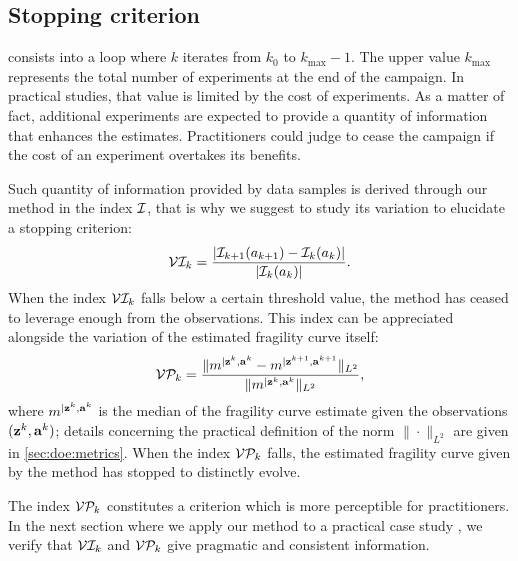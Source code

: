 

\subsection{{Stopping} criterion \label{sec:doe:stopping_crit}}

 consists into a loop where $k$ iterates from $k_0$ to $k_{\max}-1$. The upper value $k_{\max}$ represents the total number of experiments at the end of the campaign. 
In practical studies, that value is limited by the cost of experiments.
%
As a matter of fact, additional experiments are expected to provide a quantity of information that enhances the estimates. %
Practitioners could judge to cease the campaign if the cost of an experiment overtakes its benefits.

Such quantity of information provided by data samples is derived through our method in the index $\mathcal{I}$, that is why we suggest to study its variation to elucidate a {stopping} criterion:
\begin{equation}
    \mathcal{V}\mathcal{I}_k = \frac{|\mathcal{I}_{k+1}(a_{k+1})-\mathcal{I}_k(a_k)|}{|\mathcal{I}_k(a_k)|}.
\end{equation}
When the index $\mathcal{V}\mathcal{I}_k$ falls below a certain threshold value, the method has ceased to leverage enough from the observations.
This index can be appreciated alongside the variation of the estimated fragility curve itself:
    \begin{equation}
            \mathcal{V}\mathcal{P}_k = \frac{\|m^{|\mathbf{z}^k,\mathbf{a}^k} - m^{|\mathbf{z}^{k+1},\mathbf{a}^{k+1}}\|_{L^2}}{\|m^{|\mathbf{z}^k,\mathbf{a}^k}\|_{L^2}},
    \end{equation}
where $m^{|\mathbf{z}^k,\mathbf{a}^k}$ is the median of the fragility curve estimate given the observations $(\mathbf{z}^k,\mathbf{a}^k)$; details concerning the practical definition of the norm $\|\cdot\|_{L^2}$ are given in \cref{sec:doe:metrics}.
When the index $\mathcal{V}\mathcal{P}_k $ falls, the estimated fragility curve given by the method has stopped to distinctly evolve.

The index $\mathcal{V}\mathcal{P}_k$ constitutes a criterion which is more perceptible {for practitioners}.
In the next section where we apply our method to a practical case study ,{ we verify that $\mathcal{V}\mathcal{I}_k$ and $\mathcal{V}\mathcal{P}_k$ give pragmatic and consistent information.}

